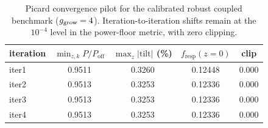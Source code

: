 \begin{table}[t]
\centering
\setlength{\tabcolsep}{6pt}
\begin{tabular}{lcccc}
\toprule
iteration & $\min_{z,k}P/P_{\mathrm{off}}$ & $\max_z|\mathrm{tilt}|$ (\%) & $f_{\mathrm{resp}}(z=0)$ & clip \\
\midrule
iter1 & 0.9511 & 0.3260 & 0.12448 & 0.000 \\
iter2 & 0.9513 & 0.3253 & 0.12336 & 0.000 \\
iter3 & 0.9513 & 0.3253 & 0.12336 & 0.000 \\
iter4 & 0.9513 & 0.3253 & 0.12336 & 0.000 \\
\bottomrule
\end{tabular}
\caption{Picard convergence pilot for the calibrated robust coupled benchmark ($g_{\rm grow}=4$). Iteration-to-iteration shifts remain at the $10^{-4}$ level in the power-floor metric, with zero clipping.}
\label{tab:picard_convergence}
\end{table}
